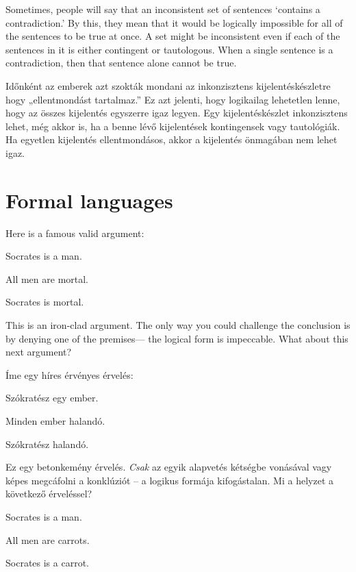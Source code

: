 Sometimes, people will say that an inconsistent set of sentences ‘contains a contradiction.’ By this, they mean that it would be logically impossible for all of the sentences to be true at once. A set might be inconsistent even if each of the sentences in it is either contingent or tautologous. When a single sentence is a contradiction, then that sentence alone cannot be true.

Időnként az emberek azt szokták mondani az inkonzisztens kijelentéskészletre hogy „ellentmondást tartalmaz.” Ez azt jelenti, hogy logikailag lehetetlen lenne, hogy az összes kijelentés egyszerre igaz legyen. Egy kijelentéskészlet inkonzisztens lehet, még akkor is, ha a benne lévő kijelentések kontingensek vagy tautológiák. Ha egyetlen kijelentés ellentmondásos, akkor a kijelentés önmagában nem lehet igaz.




\section{Formal languages}

Here is a famous valid argument:
\begin{earg}
\item[] Socrates is a man.
\item[] All men are mortal.
\item[\therefore] Socrates is mortal.
\end{earg}
This is an iron-clad argument. The only way you could challenge the conclusion is by denying one of the premises--- the logical form is impeccable. What about this next argument?

Íme egy híres érvényes érvelés:

\begin{earg}
\item[] Szókratész egy ember.
\item[] Minden ember halandó.
\item[\therefore] Szókratész halandó.
\end{earg}

Ez egy betonkemény érvelés. \emph{Csak} az egyik alapvetés kétségbe vonásával vagy képes megcáfolni a konklúziót – a logikus formája kifogástalan. Mi a helyzet a következő érveléssel?

\begin{earg}
\item[] Socrates is a man.
\item[] All men are carrots.
\item[\therefore] Socrates is a carrot.
\end{earg}

